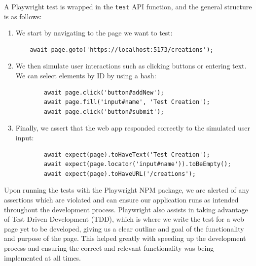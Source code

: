 \documentclass[12pt,a4paper]{article}
\begin{document}
A Playwright test is wrapped in the \verb|test| API function, and the general structure is as follows:
\begin{enumerate}
    \item We start by navigating to the page we want to test:
    \begin{lstlisting}
    await page.goto('https://localhost:5173/creations');
    \end{lstlisting}
    \item We then simulate user interactions such as clicking buttons or entering text. We can select elements by ID by using a hash:
    \begin{lstlisting}
        await page.click('button#addNew');
        await page.fill('input#name', 'Test Creation');
        await page.click('button#submit');
    \end{lstlisting}
    \item Finally, we assert that the web app responded correctly to the simulated user input:
    \begin{lstlisting}
        await expect(page).toHaveText('Test Creation');
        await expect(page.locator('input#name')).toBeEmpty();
        await expect(page).toHaveURL('/creations');
    \end{lstlisting}
\end{enumerate}
Upon running the tests with the Playwright NPM package, we are alerted of any assertions which are violated and can ensure our application runs as intended throughout the development process. Playwright also assists in taking advantage of Test Driven Development (TDD), which is where we write the test for a web page yet to be developed, giving us a clear outline and goal of the functionality and purpose of the page. This helped greatly with speeding up the development process and ensuring the correct and relevant functionality was being implemented at all times.
\end{document}
